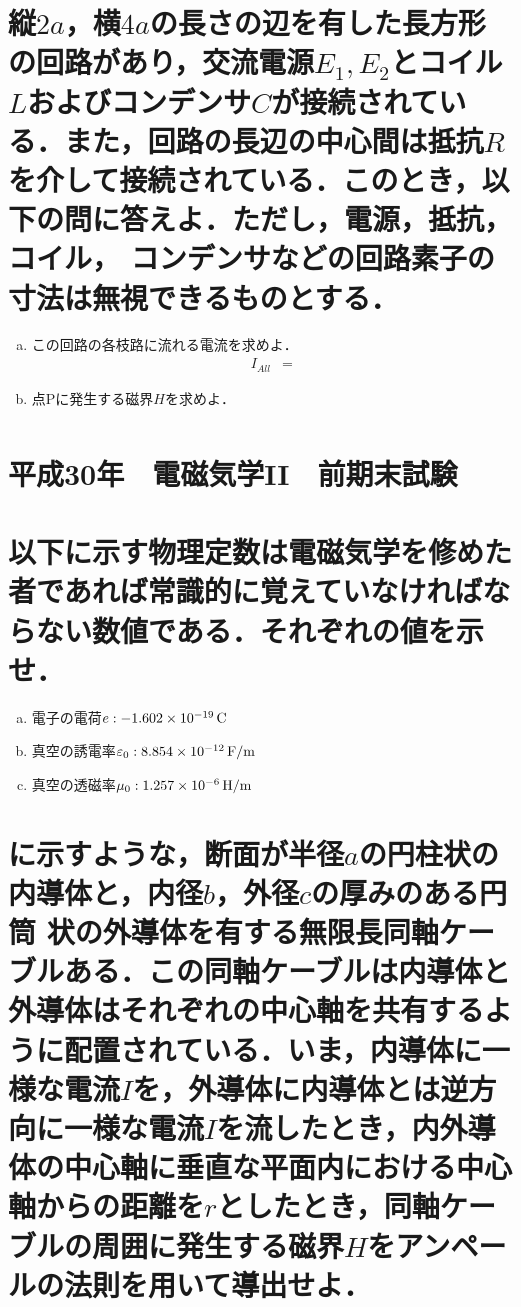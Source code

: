 \documentclass[dvipdfmx]{ujarticle}
\begin{document}
\section{縦$2a$，横$4a$の長さの辺を有した長方形の回路があり，交流電源$E_{1}, E_{2}$とコイル$L$およびコンデンサ$C$が接続されている．また，回路の長辺の中心間は抵抗$R$を介して接続されている．このとき，以下の問に答えよ．ただし，電源，抵抗，コイル， コンデンサなどの回路素子の寸法は無視できるものとする．}
\begin{enumerate}[(a)]
	\item この回路の各枝路に流れる電流を求めよ．
	\begin{align*}
		I_{All}&=
	\end{align*}
	\item 点Pに発生する磁界$H$を求めよ．
	\begin{align*}
	\end{align*}
\end{enumerate}

\clearpage
\setcounter{section}{0}
\section*{平成30年　電磁気学II　前期末試験}

\section{以下に示す物理定数は電磁気学を修めた者であれば常識的に覚えていなければならない数値である．それぞれの値を示せ．}
\begin{enumerate}[(a)]
	\item 電子の電荷$e:-1.602 \times 10^{-19}\,\rm{C}$
	\item 真空の誘電率$\varepsilon_{0}:8.854 \times 10^{-12}\,\rm{F/m}$
	\item 真空の透磁率$\mu_{0}:1.257 \times 10^{-6}\,\rm{H/m}$
\end{enumerate}

\section{に示すような，断面が半径$a$の円柱状の内導体と，内径$b$，外径$c$の厚みのある円筒 状の外導体を有する無限長同軸ケーブルある．この同軸ケーブルは内導体と外導体はそれぞれの中心軸を共有するように配置されている．いま，内導体に一様な電流$I$を，外導体に内導体とは逆方向に一様な電流$I$を流したとき，内外導体の中心軸に垂直な平面内における中心軸からの距離を$r$としたとき，同軸ケーブルの周囲に発生する磁界$H$をアンペールの法則を用いて導出せよ．}
\end{document}
